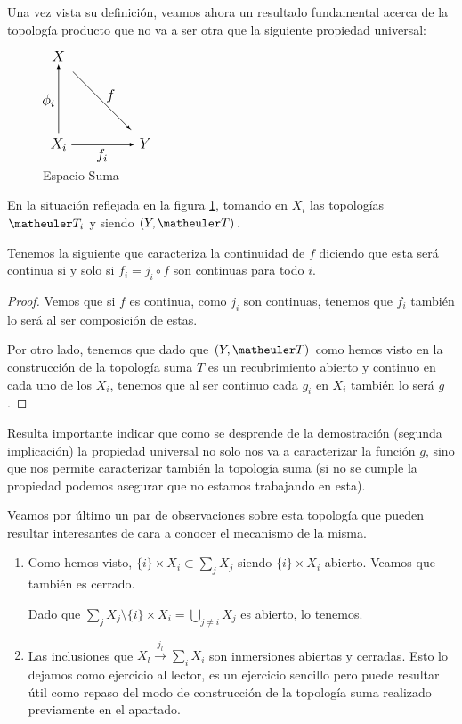 Una vez vista su definición, veamos ahora un resultado fundamental acerca de la topología producto que no va a ser otra que la siguiente propiedad universal:
	\begin{figure}
	\centering
	\includegraphics{img/EspacioSuma}
	\caption{Espacio Suma}
	\label{fig_suma}
\end{figure}
\begin{lem}
	En la situación reflejada en la figura \ref{fig_suma}, tomando en $X_i$ las topologías $\T_i$ y siendo $(Y,\T)$.

	Tenemos la siguiente  que caracteriza la continuidad de $f$ diciendo que esta será continua si y solo si  $f_i=j_i\circ f$ son continuas para todo $i$.
	
	\begin{proof}
		Vemos que si $f$ es continua, como $j_i$ son continuas, tenemos que $f_i$ también lo será al ser composición de estas.
		
		Por otro lado, tenemos que dado que $(Y,\T)$ como hemos visto en la construcción de la topología suma $T$ es un recubrimiento abierto y continuo en cada uno de los $X_i$, tenemos que al ser continuo cada $g_i$ en $X_i$ también lo será $g$.
	\end{proof}
\end{lem}

Resulta importante indicar que como se desprende de la demostración (segunda implicación) la propiedad universal no solo nos va a caracterizar la función $g$, sino que nos permite caracterizar también la topología suma (si no se cumple la propiedad podemos asegurar que no estamos trabajando en esta). 


\begin{obs}
	Veamos por último un par de observaciones sobre esta topología que pueden resultar interesantes de cara a conocer el mecanismo de la misma.
	\begin{enumerate}
	\item Como hemos visto, $\{i\}\times X_i\subset\sum_j X_j$ siendo $\{i\}\times X_i$ abierto. Veamos que también es cerrado.
	
	Dado que $\sum_j X_j\setminus \{i\}\times X_i=\bigcup_{j\ne i }X_j$ es abierto, lo tenemos.
	
	\item Las inclusiones que $X_l\stackrel{j_l}\longrightarrow\sum_iX_i$ son inmersiones abiertas y cerradas. Esto lo dejamos como ejercicio al lector, es un ejercicio sencillo pero puede resultar útil como repaso del modo de construcción de la topología suma realizado previamente en el apartado.
	\end{enumerate}
	
\end{obs}
